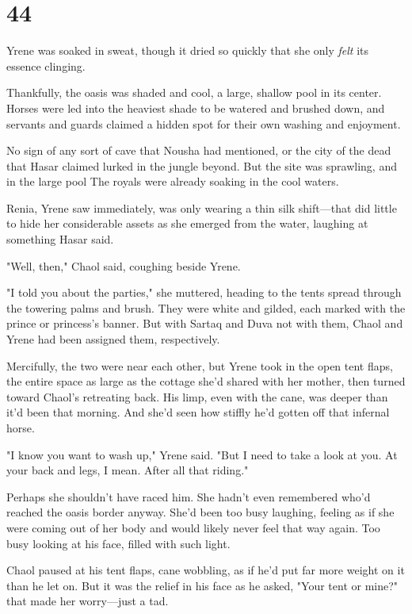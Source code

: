 
\chapter{44}

Yrene was soaked in sweat, though it dried so quickly that she only
\emph{felt} its essence clinging.

Thankfully, the oasis was shaded and cool, a large, shallow pool in its center. Horses were led into the heaviest shade to be watered and brushed down, and servants and guards claimed a hidden spot for their own washing and enjoyment.

No sign of any sort of cave that Nousha had mentioned, or the city of the dead that Hasar claimed lurked in the jungle beyond. But the site was sprawling, and in the large pool  The royals were already soaking in the cool waters.

Renia, Yrene saw immediately, was only wearing a thin silk shift---that did little to hide her considerable assets as she emerged from the water, laughing at something Hasar said.

"Well, then," Chaol said, coughing beside Yrene.

"I told you about the parties," she muttered, heading to the tents spread through the towering palms and brush. They were white and gilded, each marked with the prince or princess's banner. But with Sartaq and Duva not with them, Chaol and Yrene had been assigned them, respectively.

Mercifully, the two were near each other, but Yrene took in the open tent flaps, the entire space as large as the cottage she'd shared with her mother, then turned toward Chaol's retreating back. His limp, even with the cane, was deeper than it'd been that morning. And she'd seen how stiffly he'd gotten off that infernal horse.

"I know you want to wash up," Yrene said. "But I need to take a look at you. At your back and legs, I mean. After all that riding."

Perhaps she shouldn't have raced him. She hadn't even remembered who'd reached the oasis border anyway. She'd been too busy laughing, feeling as if she were coming out of her body and would likely never feel that way again. Too busy looking at his face, filled with such light.

Chaol paused at his tent flaps, cane wobbling, as if he'd put far more weight on it than he let on. But it was the relief in his face as he asked, "Your tent or mine?" that made her worry---just a tad.

